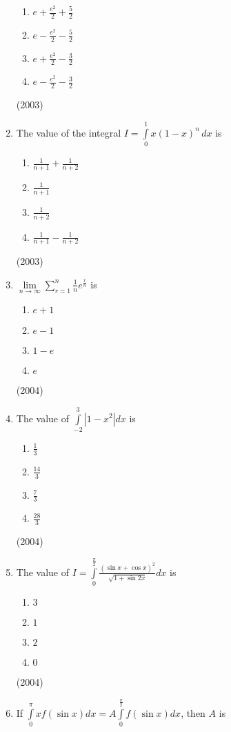 \documentclass[journal,12pt,twocolumn]{IEEEtran}
\theoremstyle{remark}
\begin{document}
\begin{enumerate}[1.]
			\begin {enumerate}
				\item $e+ \frac{e^2}{2} + \frac{5}{2}$
				\item $e- \frac{e^2}{2} - \frac{5}{2}$
				\item $e+ \frac{e^2}{2} - \frac{3}{2}$
				\item $e- \frac{e^2}{2} - \frac{3}{2}$
			\end {enumerate}
			\hfill (2003)
	\item
		The value of the integral $I = \int \limits_0^1 x(1-x)^n \, dx$ is
			\begin{enumerate}
				\item $\frac{1}{n+1} + \frac{1}{n+2}$
				\item $\frac{1}{n+1}$
				\item $\frac{1}{n+2}$
				\item $\frac{1}{n+1} - \frac{1}{n+2}$
			\end{enumerate}
			\hfill (2003)
	\item
		$\lim \limits_{n \to \infty} \sum \limits_{r=1}^{n} \frac{1}{n} e^{\frac{r}{n}}$ is
			\begin{enumerate}
				\item $e+1$
				\item $e-1$
				\item $1-e$
				\item $e$	
			\end{enumerate}
			\hfill (2004)
	\item 
		The value of $\int \limits_{-2}^{3} |1-x^2|dx$ is 
			\begin{enumerate}
				\item $\frac{1}{3}$
				\item $\frac{14}{3}$
				\item $\frac{7}{3}$
				\item $\frac{28}{3}$
			\end{enumerate}
			\hfill (2004)
	\item
		The value of $I = \int \limits_0^{\frac{\pi}{2}} \frac{(\sin x + \cos x)^2}{\sqrt{1+ \sin 2x}} dx$ is
			\begin{enumerate}
				\item $3$
				\item $1$
				\item $2$
				\item $0$
			\end{enumerate}
			\hfill (2004)
	\item
		If $\int \limits_{0}^{\pi} x f(\sin x)dx = A \int \limits_{0}^{\frac{\pi}{2}} f(\sin x)dx$, then $A$ is 

\end{enumerate}
\end{document}
